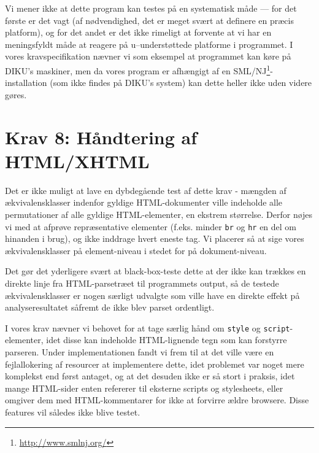 \documentclass[a4paper,oneside,article]{memoir}
\begin{document}
\begin{landscape}
Vi mener ikke at dette program kan testes på en systematisk måde ---
for det første er det vagt (af nødvendighed, det er meget svært at
definere en præcis platform), og for det andet er det ikke rimeligt at
forvente at vi har en meningsfyldt måde at reagere på u--understøttede
platforme i programmet. I vores kravspecifikation nævner vi som
eksempel at programmet kan køre på DIKU's maskiner, men da vores
program er afhængigt af en
SML/NJ\footnote{\url{http://www.smlnj.org/}}-installation (som ikke
findes på DIKU's system) kan dette heller ikke uden videre gøres.

\section{Krav 8: Håndtering af HTML/XHTML}

Det er ikke muligt at lave en dybdegående test af dette krav - mængden
af ækvivalensklasser indenfor gyldige HTML-dokumenter ville indeholde
alle permutationer af alle gyldige HTML-elementer, en ekstrem
størrelse. Derfor nøjes vi med at afprøve repræsentative elementer
(f.eks. minder \texttt{br} og \texttt{hr} en del om hinanden i brug),
og ikke inddrage hvert eneste tag. Vi placerer så at sige vores
ækvivalensklasser på element-niveau i stedet for på dokument-niveau.

Det gør det yderligere svært at black-box-teste dette at der ikke kan
trækkes en direkte linje fra HTML-parsetræet til programmets output,
så de testede ækvivalensklasser er nogen særligt udvalgte som ville
have en direkte effekt på analyseresultatet såfremt de ikke blev
parset ordentligt.

I vores krav nævner vi behovet for at tage særlig hånd om
\texttt{style} og \texttt{script}-elementer, idet disse kan indeholde
HTML-lignende tegn som kan forstyrre parseren. Under implementationen
fandt vi frem til at det ville være en fejlallokering af resourcer at
implementere dette, idet problemet var noget mere komplekst end først
antaget, og at det desuden ikke er så stort i praksis, idet mange
HTML-sider enten refererer til eksterne scripts og stylesheets, eller
omgiver dem med HTML-kommentarer for ikke at forvirre ældre
browsere. Disse features vil således ikke blive testet.


\end{landscape}
\end{document}
